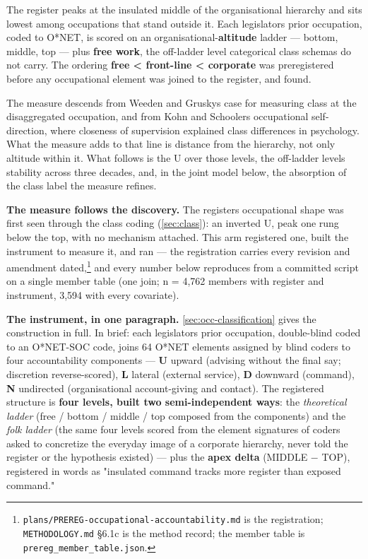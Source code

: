 The register peaks at the insulated middle of the organisational hierarchy and sits lowest among occupations that stand outside it. Each legislator\textquotesingle s prior occupation, coded to O*NET, is scored on an organisational-\textbf{altitude} ladder --- bottom, middle, top --- plus \textbf{free work}, the off-ladder level categorical class schemas do not carry. The ordering \textbf{free \textless{} front-line \textless{} corporate} was preregistered before any occupational element was joined to the register, and found.

The measure descends from Weeden and Grusky\textquotesingle s\cite{weeden2005} case for measuring class at the disaggregated occupation, and from Kohn and Schooler\textquotesingle s\cite{kohn1983} occupational self-direction, where closeness of supervision explained class differences in psychology. What the measure adds to that line is distance from the hierarchy, not only altitude within it. What follows is the U over those levels, the off-ladder level\textquotesingle s stability across three decades, and, in the joint model below, the absorption of the class label the measure refines.

\textbf{The measure follows the discovery.} The register\textquotesingle s
occupational shape was first seen through the class coding (\cref{sec:class}): an
inverted U, peak one rung below the top, with no mechanism attached. This
arm registered one, built the instrument to measure it, and ran --- the
registration carries every revision and amendment dated,\footnote{\texttt{plans/\allowbreak{}PREREG-\allowbreak{}occupational-\allowbreak{}accountability.\allowbreak{}md} is the
  registration; \texttt{METHODOLOGY.md} §6.1c is the method record; the member table
  is \texttt{prereg\_\allowbreak{}member\_\allowbreak{}table.\allowbreak{}json}.} and every
number below reproduces from a committed script on a single member table
(one join; n = 4,762 members with register and
instrument, 3,594 with every covariate).

\textbf{The instrument, in one paragraph.} \cref{sec:occ-classification} gives the construction in full.
In brief: each legislator\textquotesingle s prior occupation, double-blind coded to an
O*NET-SOC code, joins 64 O*NET elements assigned by blind coders to four
accountability components --- \textbf{U} upward (advising without the final say;
discretion reverse-scored), \textbf{L} lateral (external service), \textbf{D} downward
(command), \textbf{N} undirected (organisational account-giving and contact). The
registered structure is \textbf{four levels, built two semi-independent ways}: the
\emph{theoretical ladder} (free / bottom / middle / top composed from the
components) and the \emph{folk ladder} (the same four levels scored from the
element signatures of coders asked to concretize the everyday image of a
corporate hierarchy, never told the register or the hypothesis existed) ---
plus the \textbf{apex delta} (MIDDLE \(-\) TOP), registered in words as "insulated
command tracks more register than exposed command."

